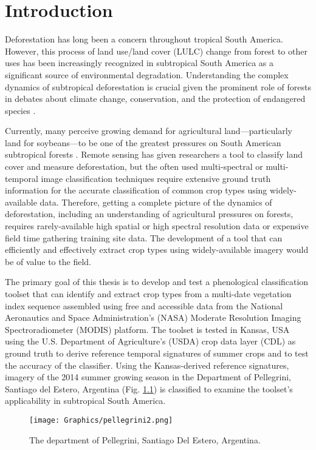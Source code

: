 \chapter{Introduction}

Deforestation has long been a concern throughout tropical South America. However, this process of land use/land cover (LULC) change from forest to other uses has been increasingly recognized in subtropical South America as a significant source of environmental degradation. Understanding the complex dynamics of subtropical deforestation is crucial given the prominent role of forests in debates about climate change, conservation, and the protection of endangered species \autocites{geist2002proximate}{zak2004do-subtropical}{bonnie2000counting}{houghton1994the-worldwide}{sala2000global}.

Currently, many perceive growing demand for agricultural land---particularly land for soybeans---to be one of the greatest pressures on South American subtropical forests \autocites{pengue2005transgenic}{grau2005agriculture}{altieri2006gm-soybean:}. Remote sensing has given researchers a tool to classify land cover and measure deforestation, but the often used multi-spectral or multi-temporal image classification techniques require extensive ground truth information for the accurate classification of common crop types using widely-available data. Therefore, getting a complete picture of the dynamics of deforestation, including an understanding of agricultural pressures on forests, requires rarely-available high spatial or high spectral resolution data \autocite{senay2000using} or expensive field time gathering training site data. The development of a tool that can efficiently and effectively extract crop types using widely-available imagery would be of value to the field.

The primary goal of this thesis is to develop and test a phenological classification toolset that can identify and extract crop types from a multi-date vegetation index sequence assembled using free and accessible data from the National Aeronautics and Space Administration’s (NASA) Moderate Resolution Imaging Spectroradiometer (MODIS) platform. The toolset is tested in Kansas, USA using the U.S. Department of Agriculture's (USDA) crop data layer (CDL) as ground truth to derive reference temporal signatures of summer crops and to test the accuracy of the classifier. Using the Kansas-derived reference signatures, imagery of the 2014 summer growing season in the Department of Pellegrini, Santiago del Estero, Argentina (Fig. \ref{fig:pellegrini}) is classified to examine the toolset's applicability in subtropical South America.

\begin{figure}
  \centering
  \texttt{[image: Graphics/pellegrini2.png]}
  \caption{The department of Pellegrini, Santiago Del Estero, Argentina.}
  \label{fig:pellegrini}
\end{figure}

